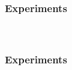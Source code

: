 
\begin{frame}[t]
	\frametitle{Experiments}
	\framesubtitle{~~}  %

\end{frame}
\begin{frame}[t]
	\frametitle{Experiments}
	\framesubtitle{~~}  %

\end{frame}


